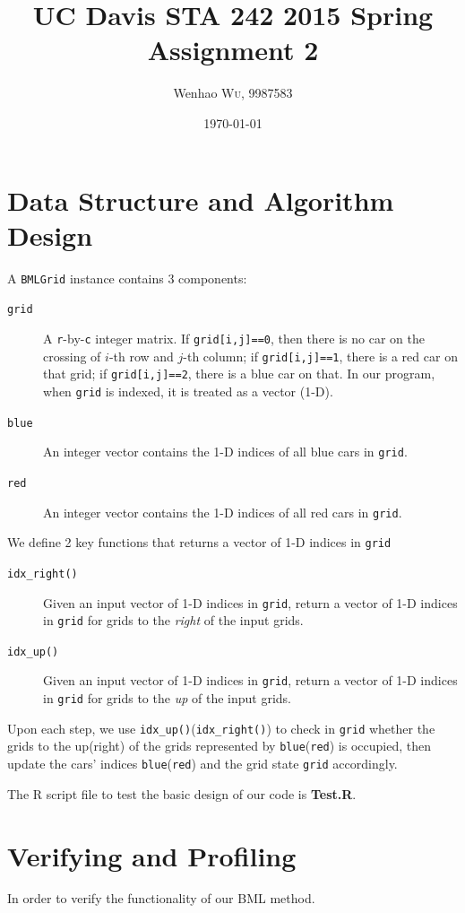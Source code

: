 \documentclass[twocolumn]{article}
\title{UC Davis STA 242 2015 Spring Assignment 2} %
\author{Wenhao \textsc{Wu}, 9987583} %
\date{\today} %
\begin{document}
\maketitle %


\section{Data Structure and Algorithm Design}
A \texttt{BMLGrid} instance contains 3 components:
\begin{description}
    \item[\texttt{grid}] A \texttt{r}-by-\texttt{c} integer matrix. If
    \texttt{grid[i,j]==0}, then there is no car on the crossing of $i$-th row
    and $j$-th column; if \texttt{grid[i,j]==1}, there is a red car on that
    grid; if \texttt{grid[i,j]==2}, there is a blue car on that. In our program,
    when \texttt{grid} is indexed, it is treated as a vector (1-D).
    \item[\texttt{blue}] An integer vector contains the 1-D indices of
    all blue cars in \texttt{grid}.
    \item[\texttt{red}] An integer vector contains the 1-D indices of
    all red cars in \texttt{grid}.
\end{description}
We define 2 key functions that returns a vector of 1-D
indices in \texttt{grid}
\begin{description}
    \item[\texttt{idx\_right()}] Given an input vector of 1-D indices in
    \texttt{grid}, return a vector of 1-D indices in \texttt{grid} for grids to
    the \emph{right} of the input grids.
    \item[\texttt{idx\_up()}] Given an input vector of 1-D indices in
    \texttt{grid}, return a vector of 1-D indices in \texttt{grid} for grids to
    the \emph{up} of the input grids.
\end{description}
Upon each step, we use \texttt{idx\_up()}(\texttt{idx\_right()}) to check in
\texttt{grid} whether the grids to the up(right) of the grids represented by
\texttt{blue}(\texttt{red}) is occupied, then update the cars' indices
\texttt{blue}(\texttt{red}) and the grid state \texttt{grid} accordingly.

The R script file to test the basic design of our code is \textbf{Test.R}.

\section{Verifying and Profiling}
In order to verify the functionality of our BML method.
\end{document}
